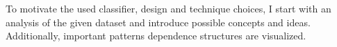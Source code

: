 To motivate the used classifier, design and technique
choices, I start with an analysis of the given dataset and introduce possible concepts and ideas. Additionally, important patterns dependence structures are visualized.